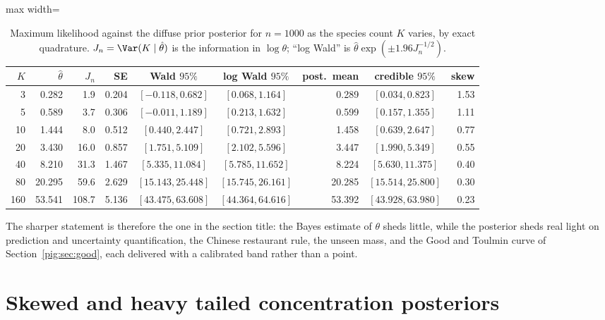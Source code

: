 \begin{table}[t]
\centering
\caption{Maximum likelihood against the diffuse prior posterior for $n=1000$ as the species count $K$ varies, by exact quadrature. $J_n=\Var(K\mid\hat\theta)$ is the information in $\log\theta$; ``log Wald'' is $\hat\theta\exp(\pm1.96J_n^{-1/2})$.}
\label{pig:tab:bvm}
\begin{adjustbox}{max width=\textwidth}
\begin{tabular}{@{}rrrrccrcr@{}}
\toprule
$K$ & $\hat\theta$ & $J_n$ & SE & Wald $95\%$ & log Wald $95\%$ & post.\ mean & credible $95\%$ & skew\\
\midrule
3 & 0.282 & 1.9 & 0.204 & $[-0.118, 0.682]$ & $[0.068, 1.164]$ & 0.289 & $[0.034, 0.823]$ & 1.53\\
5 & 0.589 & 3.7 & 0.306 & $[-0.011, 1.189]$ & $[0.213, 1.632]$ & 0.599 & $[0.157, 1.355]$ & 1.11\\
10 & 1.444 & 8.0 & 0.512 & $[0.440, 2.447]$ & $[0.721, 2.893]$ & 1.458 & $[0.639, 2.647]$ & 0.77\\
20 & 3.430 & 16.0 & 0.857 & $[1.751, 5.109]$ & $[2.102, 5.596]$ & 3.447 & $[1.990, 5.349]$ & 0.55\\
40 & 8.210 & 31.3 & 1.467 & $[5.335, 11.084]$ & $[5.785, 11.652]$ & 8.224 & $[5.630, 11.375]$ & 0.40\\
80 & 20.295 & 59.6 & 2.629 & $[15.143, 25.448]$ & $[15.745, 26.161]$ & 20.285 & $[15.514, 25.800]$ & 0.30\\
160 & 53.541 & 108.7 & 5.136 & $[43.475, 63.608]$ & $[44.364, 64.616]$ & 53.392 & $[43.928, 63.980]$ & 0.23\\
\bottomrule
\end{tabular}
\end{adjustbox}
\end{table}

The sharper statement is therefore the one in the section title: the Bayes estimate of $\theta$ sheds little, while the posterior sheds real light on prediction and uncertainty quantification, the Chinese restaurant rule, the unseen mass, and the Good and Toulmin curve of Section~\ref{pig:sec:good}, each delivered with a calibrated band rather than a point.

\section{Skewed and heavy tailed concentration posteriors}\label{pig:sec:tails}

